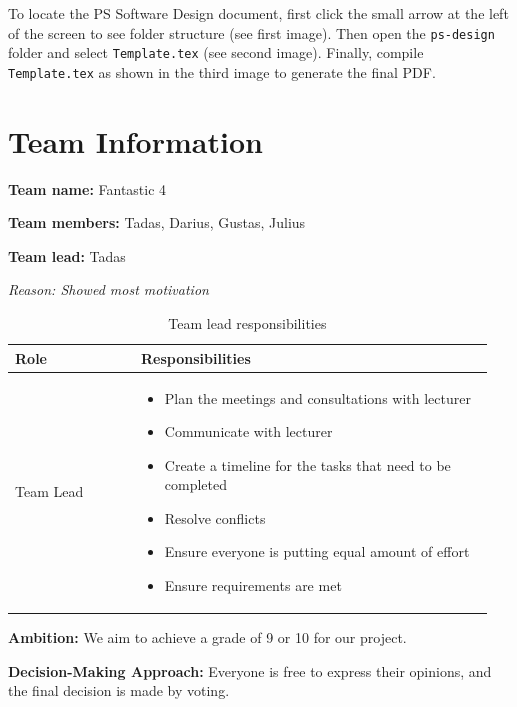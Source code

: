 \documentclass[]{VUMIFTemplateClass}
\begin{document}
\noindent To locate the PS Software Design document, first click the small arrow
at the left of the screen to see folder structure (see first image). Then open
the \texttt{ps-design} folder and select \texttt{Template.tex} (see second
image). Finally, compile \texttt{Template.tex} as
shown in the third image to generate the final PDF.

\section{Team Information}

\textbf{Team name:} Fantastic 4 

\textbf{Team members:} Tadas, Darius, Gustas, Julius 

\textbf{Team lead:} Tadas

\textit{Reason: Showed most motivation}

\vspace{1cm}

\begin{table}[H]
\caption{Team lead responsibilities}
\centering
\begin{tabular}{p{0.25\linewidth} p{0.70\linewidth}}
\textbf{Role} & \textbf{Responsibilities} \\
\hline
Team Lead &
\begin{minipage}[t]{\linewidth}
\begin{itemize}
    \item Plan the meetings and consultations with lecturer
    \item Communicate with lecturer
    \item Create a timeline for the tasks that need to be completed
    \item Resolve conflicts
    \item Ensure everyone is putting equal amount of effort
    \item Ensure requirements are met
\end{itemize}
\end{minipage}
\end{tabular}
\label{tab:team-lead-resp}
\end{table}

\vspace{1cm}

\textbf{Ambition:} We aim to achieve a grade of 9 or 10 for our project.

\textbf{Decision-Making Approach:} Everyone is free to express their opinions, and the final decision is made by voting.
\end{document}
